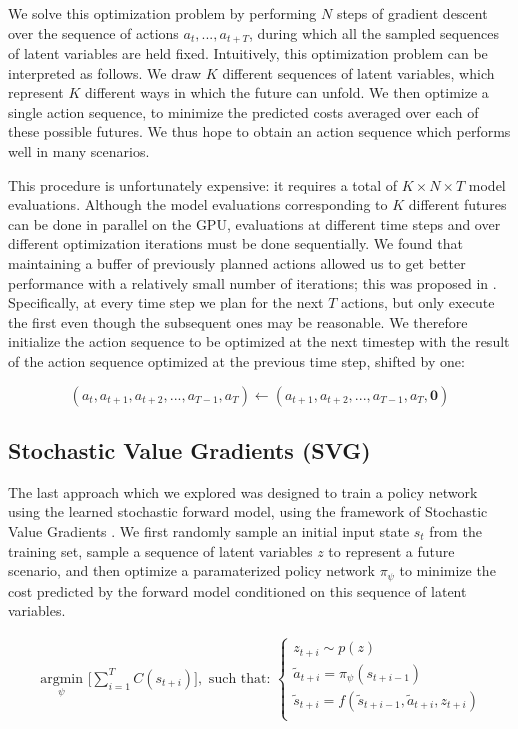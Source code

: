 \documentclass{article} %
\begin{document}
  We solve this optimization problem by performing $N$ steps of gradient descent over the sequence of actions $a_t, ..., a_{t+T}$, during which all the sampled sequences of latent variables are held fixed.
  Intuitively, this optimization problem can be interpreted as follows. We draw $K$ different sequences of latent variables, which represent $K$ different ways in which the future can unfold.
  We then optimize a single action sequence, to minimize the predicted costs averaged over each of these possible futures.
  We thus hope to obtain an action sequence which performs well in many scenarios.

  This procedure is unfortunately expensive: it requires a total of $K \times N \times T$ model evaluations. Although the model evaluations corresponding to $K$ different futures can be done in parallel on the GPU, evaluations at different time steps and over different optimization iterations must be done sequentially.
  We found that maintaining a buffer of previously planned actions allowed us to get better performance with a relatively small number of iterations; this was proposed in \citep{Ohtsuka04}.
  Specifically, at every time step we plan for the next $T$ actions, but only execute the first even though the subsequent ones may be reasonable.
  We therefore initialize the action sequence to be optimized at the next timestep with the result of the action sequence optimized at the previous time step, shifted by one:

  \begin{equation}
    (a_t, a_{t+1}, a_{t+2}, ..., a_{T-1}, a_T) \leftarrow (a_{t+1}, a_{t+2}, ..., a_{T-1}, a_T, \mathbf{0})
  \end{equation}


  \subsection{Stochastic Value Gradients (SVG)}

  The last approach which we explored was designed to train a policy network using the learned stochastic forward model, using the framework of Stochastic Value Gradients \citep{SVG}.
  We first randomly sample an initial input state $s_t$ from the training set, sample a sequence of latent variables $z$ to represent a future scenario, and then optimize a paramaterized policy network $\pi_\psi$ to minimize the cost predicted by the forward model conditioned on this sequence of latent variables.

    \begin{align*}
    \underset{\psi}{\mbox{ argmin }} \Big[ \sum_{i=1}^{T} C(s_{t+i}) \Big],  \mbox{ such that: }
    \begin{cases}
      z_{t+i} \sim p(z) \\
      \tilde{a}_{t+i} = \pi_\psi(s_{t+i-1}) \\
      \tilde{s}_{t+i} = f(\tilde{s}_{t+i-1}, \tilde{a}_{t+i}, z_{t+i}) \\
      \end{cases}
    \end{align*}
\end{document}
